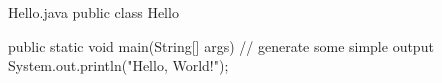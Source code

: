 \begin{trinket}[235]{Hello.java}
public class Hello {

    public static void main(String[] args) {
    // generate some simple output
    System.out.println("Hello, World!");
    }
}
\end{trinket}
